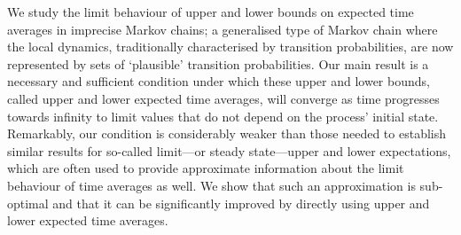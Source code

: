 
We study the limit behaviour of upper and lower bounds on expected time averages in imprecise Markov chains; a generalised type of Markov chain where the local dynamics, traditionally characterised by transition probabilities, are now represented by sets of `plausible' transition probabilities.
Our main result is a necessary and sufficient condition under which these upper and lower bounds, called upper and lower expected time averages, will converge as time progresses towards infinity to limit values that do not depend on the process' initial state.
Remarkably, our condition is considerably weaker than those needed to establish similar results for so-called limit---or steady state---upper and lower expectations, which are often used to provide approximate information about the limit behaviour of time averages as well.
We show that such an approximation is sub-optimal and that it can be significantly improved by directly using upper and lower expected time averages.

